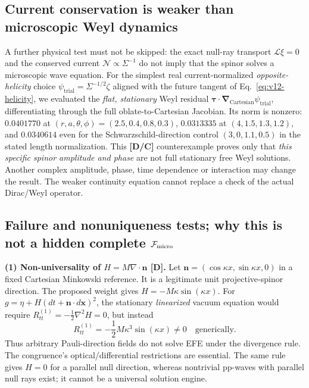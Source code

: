 \documentclass[11pt,a4paper]{article}
\begin{document}
\subsection{Current conservation is weaker than microscopic Weyl dynamics}
A further physical test must not be skipped: the exact null-ray transport $\mathcal L\xi=0$ and the conserved current $\mathcal N\propto\Sigma^{-1}$ do not imply that the spinor solves a microscopic wave equation. For the simplest real current-normalized \emph{opposite-helicity} choice $\psi_\mathrm{trial}=\Sigma^{-1/2}\zeta$ aligned with the future tangent of Eq.~\eqref{eq:v12-helicity}, we evaluated the \emph{flat, stationary} Weyl residual $\boldsymbol\tau\cdot\boldsymbol\nabla_{\!\mathrm{Cartesian}}\psi_\mathrm{trial}$, differentiating through the full oblate-to-Cartesian Jacobian. Its norm is nonzero: $0.0401770$ at $(r,a,\theta,\phi)=(2.5,0.4,0.8,0.3)$, $0.0313335$ at $(4,1.5,1.3,1.2)$, and $0.0340614$ even for the Schwarzschild-direction control $(3,0,1.1,0.5)$ in the stated length normalization. This \textbf{[D/C]} counterexample proves only that \emph{this specific spinor amplitude and phase} are not full stationary free Weyl solutions. Another complex amplitude, phase, time dependence or interaction may change the result. The weaker continuity equation cannot replace a check of the actual Dirac/Weyl operator.\par

\subsection{Failure and nonuniqueness tests; why this is not a hidden complete $\mathcal F_{\rm micro}$}
\textbf{(1) Non-universality of $H=M\nabla\cdot\boldsymbol n$ [D].} Let $\boldsymbol n=(\cos\kappa x,\sin\kappa x,0)$ in a fixed Cartesian Minkowski reference. It is a legitimate unit projective-spinor direction. The proposed weight gives $H=-M\kappa\sin(\kappa x)$. For $g=\eta+H(dt+\boldsymbol n\cdot d\boldsymbol x)^2$, the stationary \emph{linearized} vacuum equation would require $R_{tt}^{(1)}=-\tfrac12\nabla^2H=0$, but instead
\begin{equation}\label{eq:v12-counterexample}
\boxed{R_{tt}^{(1)}=-\frac12M\kappa^3\sin(\kappa x)\ne0\quad\text{generically}.}
\end{equation}
Thus arbitrary Pauli-direction fields do not solve EFE under the divergence rule. The congruence's optical/differential restrictions are essential. The same rule gives $H=0$ for a parallel null direction, whereas nontrivial pp-waves with parallel null rays exist; it cannot be a universal solution engine.
\end{document}

